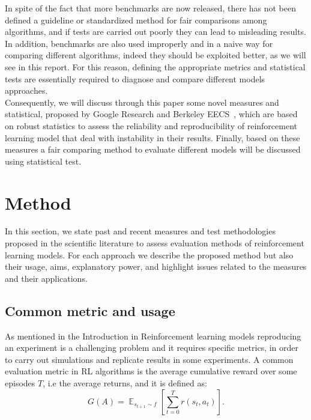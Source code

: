 \documentclass{article}
\DeclareMathOperator{\EX}{\mathbb{E}}%
\begin{document}
In spite of the fact that more benchmarks are now released, there has not been defined a guideline or standardized method for fair comparisons among algorithms, and if tests are carried out poorly they can lead to misleading results. In addition, benchmarks are also used improperly and in a naive way for comparing different algorithms, indeed they should be exploited better, as we will see in this report.
For this reason, defining the appropriate metrics and statistical tests are essentially required to diagnose and compare different models approaches.\\
Consequently, we will discuss through this paper some novel measures and statistical, proposed by Google Research and Berkeley EECS~\cite{GoogleMeasure}, which are based on robust statistics to assess the reliability and reproducibility of reinforcement learning model that deal with instability in their results. Finally, based on these measures a fair comparing method to evaluate different models will be discussed using statistical test.
\section{Method}
In this section, we state past and recent measures and test methodologies proposed in the scientific literature to assess evaluation methods of reinforcement learning models. For each approach we describe the proposed method but also their usage, aims, explanatory power, and highlight issues related to the measures and their applications.
\subsection{Common metric and usage}
As mentioned in the Introduction in Reinforcement learning models reproducing an experiment is a challenging problem and it requires specific metrics, in order to carry out simulations and replicate results in some experiments.
A common evaluation metric in RL algorithms is the average cumulative reward over some episodes $T$, i.e the average returns, and it is defined as:	
\begin{equation}
G(A) = \EX_{s_{t+1} \sim f} \left[\sum_{t=0}^{T} r(s_t, a_t)\right].	
\end{equation}
\end{document}

